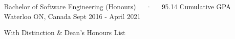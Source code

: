 
\begin{cventries}

  \vspace{0.5mm}

  	{Bachelor of Software Engineering (Honours)~~~·~~~95.14 Cumulative GPA}
  	 {Waterloo ON, Canada}
  	 {Sept 2016 - April 2021} {
    \begin{cvitems}
    \item With Distinction \& Dean's Honours List
    \end{cvitems}
  }
  

\end{cventries}
